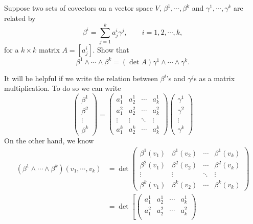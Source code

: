\begin{problem}
	\label{problem:wedgeProductTransformation}
	Suppose two sets of covectors on  a vector space $ V $, $ \beta^ 1,\cdots,\beta^k $ and $ \gamma^1,\cdots, \gamma^k $ are related by
	\[ \beta^i = \sum_{j=1}^{k} a_j^i \gamma ^j, \qquad i = 1,2,\cdots, k, \]
	for a $ k\times k $ matrix $ A = \left[a_j^i\right] $. Show that 
	\[ \beta^1 \wedge \cdots \wedge \beta^k = (\det A) \gamma^1 \wedge \cdots \wedge \gamma^k. \]
\end{problem}
\begin{solution}
	It will be helpful if we write the relation between $ \beta^i $'s and $ \gamma^j $s as a matrix multiplication. To do so we can write
	\[ 
	\begin{pmatrix}
		\beta^1 \\
		\beta^2 \\
		\vdots \\
		\beta^k
	\end{pmatrix} = 
	\begin{pmatrix}
		a^1_1 & a^1_2 & \cdots & a^1_k \\
		a^2_1 & a^2_2 & \cdots & a^2_k \\
		\vdots & \vdots & \ddots & \vdots \\
		a^k_1 & a^k_2 & \cdots & a^k_k
	\end{pmatrix}
	\begin{pmatrix}
		\gamma^1 \\
		\gamma^2 \\
		\vdots \\
		\gamma^k
	\end{pmatrix}
	 \]
	 On the other hand, we know
	 \begin{align*}
	 	(\beta^1\wedge\cdots \wedge \beta^k)(v_1,\cdots,v_k) 
	 	&= \det 
	 	\begin{pmatrix}
	 		\beta^1(v_1) & \beta^1(v_2) & \cdots & \beta^1(v_k) \\
	 		\beta^2(v_1) & \beta^2(v_2) & \cdots & \beta^2(v_k) \\
	 		\vdots & \vdots & \ddots & \vdots \\
	 		\beta^k(v_1) & \beta^k(v_2) & \cdots & \beta^k(v_k)
	 	\end{pmatrix}
	 	\\
	 	&= \det \left[
	 	\begin{pmatrix}
	 		a^1_1 & a^1_2 & \cdots & a^1_k \\
	 		a^2_1 & a^2_2 & \cdots & a^2_k \\

\end{pmatrix}
\end{align*}
\end{solution}
